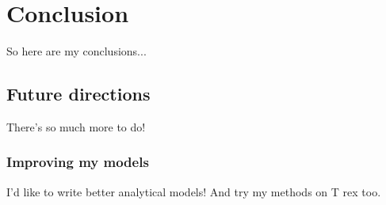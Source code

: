\chapter{Conclusion}
\label{chap:conclusions}

So here are my conclusions...

\section{Future directions}
\label{sec:future-directions}

There's so much more to do!

\subsection{Improving my models}
\label{sec:bett-spec-models}

I'd like to write better analytical models! And try my methods on T rex too.
